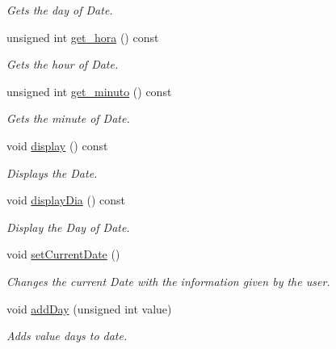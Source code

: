 \begin{DoxyCompactItemize}
\begin{DoxyCompactList}\small\item\em Gets the day of Date. \end{DoxyCompactList}\item 
unsigned int \hyperlink{class_data_a4fd55e69488db5ff91889f0d6bf8dd8a}{get\+\_\+hora} () const
\begin{DoxyCompactList}\small\item\em Gets the hour of Date. \end{DoxyCompactList}\item 
unsigned int \hyperlink{class_data_a0bf464cec85f16bc16ccc14de621bfc9}{get\+\_\+minuto} () const
\begin{DoxyCompactList}\small\item\em Gets the minute of Date. \end{DoxyCompactList}\item 
\mbox{\label{class_data_a863665baeb1f5223d51cc1ba8b89610c}} 
void \hyperlink{class_data_a863665baeb1f5223d51cc1ba8b89610c}{display} () const
\begin{DoxyCompactList}\small\item\em Displays the Date. \end{DoxyCompactList}\item 
\mbox{\label{class_data_a8654aeb5510ff42d0c9e1141c811c15c}} 
void \hyperlink{class_data_a8654aeb5510ff42d0c9e1141c811c15c}{display\+Dia} () const
\begin{DoxyCompactList}\small\item\em Display the Day of Date. \end{DoxyCompactList}\item 
\mbox{\label{class_data_abd33c4d38760deac4bc5f5dd5a4dd19d}} 
void \hyperlink{class_data_abd33c4d38760deac4bc5f5dd5a4dd19d}{set\+Current\+Date} ()
\begin{DoxyCompactList}\small\item\em Changes the current Date with the information given by the user. \end{DoxyCompactList}\item 
void \hyperlink{class_data_a619209bb358ee2afa9e85ad79c3fdea1}{add\+Day} (unsigned int value)
\begin{DoxyCompactList}\small\item\em Adds value days to date. \end{DoxyCompactList}\end{DoxyCompactItemize}

